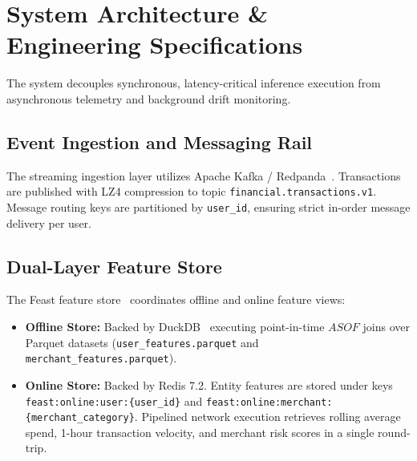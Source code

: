 \section{System Architecture \& Engineering Specifications}
\label{sec:architecture}

The system decouples synchronous, latency-critical inference execution from asynchronous telemetry and background drift monitoring.

\subsection{Event Ingestion and Messaging Rail}
The streaming ingestion layer utilizes Apache Kafka / Redpanda~\cite{kreps2011kafka}. Transactions are published with LZ4 compression to topic \texttt{financial.transactions.v1}. Message routing keys are partitioned by \texttt{user\_id}, ensuring strict in-order message delivery per user.

\subsection{Dual-Layer Feature Store}
The Feast feature store~\cite{feast2024} coordinates offline and online feature views:
\begin{itemize}
    \item \textbf{Offline Store:} Backed by DuckDB~\cite{raasveldt2019duckdb} executing point-in-time $ASOF$ joins over Parquet datasets (\texttt{user\_features.parquet} and \texttt{merchant\_features.parquet}).
    \item \textbf{Online Store:} Backed by Redis 7.2. Entity features are stored under keys \texttt{feast:online:user:\{user\_id\}} and \texttt{feast:online:merchant:\{merchant\_category\}}. Pipelined network execution retrieves rolling average spend, 1-hour transaction velocity, and merchant risk scores in a single round-trip.
\end{itemize}

